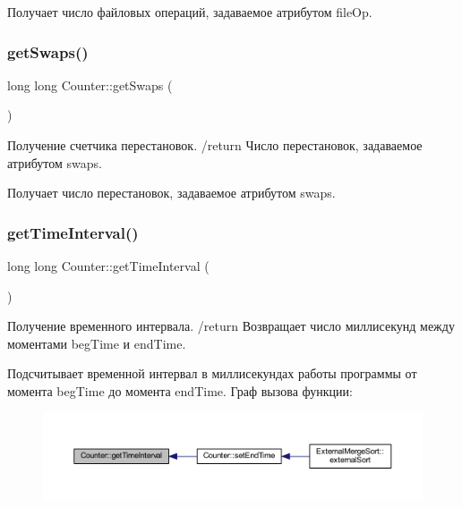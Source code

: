 Получает число файловых операций, задаваемое атрибутом file\+Op. \hypertarget{class_counter_ae8d7757e6613ed651f7f505931cb377c}{}\label{class_counter_ae8d7757e6613ed651f7f505931cb377c} 
\subsubsection{\texorpdfstring{get\+Swaps()}{getSwaps()}}
{\footnotesize\ttfamily long long Counter\+::get\+Swaps (\begin{DoxyParamCaption}{ }\end{DoxyParamCaption})}



Получение счетчика перестановок. /return Число перестановок, задаваемое атрибутом swaps. 

Получает число перестановок, задаваемое атрибутом swaps. \hypertarget{class_counter_ae5acb21f01b8317c8db1d99f7b56dc95}{}\label{class_counter_ae5acb21f01b8317c8db1d99f7b56dc95} 
\subsubsection{\texorpdfstring{get\+Time\+Interval()}{getTimeInterval()}}
{\footnotesize\ttfamily long long Counter\+::get\+Time\+Interval (\begin{DoxyParamCaption}{ }\end{DoxyParamCaption})}



Получение временного интервала. /return Возвращает число миллисекунд между моментами beg\+Time и end\+Time. 

Подсчитывает временной интервал в миллисекундах работы программы от момента beg\+Time до момента end\+Time. Граф вызова функции\+:\nopagebreak
\begin{figure}[H]
\begin{center}
\leavevmode
\includegraphics[width=350pt]{class_counter_ae5acb21f01b8317c8db1d99f7b56dc95_icgraph}
\end{center}
\end{figure}
\hypertarget{class_counter_a224d93150c0fe2982d3efd7aa99668e6}{}\label{class_counter_a224d93150c0fe2982d3efd7aa99668e6} 
